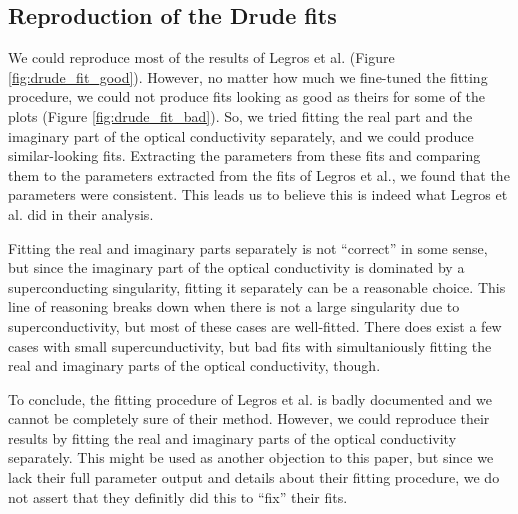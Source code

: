 \subsection{Reproduction of the Drude fits}
We could reproduce most of the results of Legros et al. (Figure \ref{fig:drude_fit_good}).
However, no matter how much we fine-tuned the fitting procedure, we could not produce fits looking
as good as theirs for some of the plots (Figure \ref{fig:drude_fit_bad}). So, we tried fitting the
real part and the imaginary part of the optical conductivity separately, and we could produce
similar-looking fits. Extracting the parameters from these fits and comparing them to the parameters
extracted from the fits of Legros et al., we found that the parameters were consistent. This leads
us to believe this is indeed what Legros et al. did in their analysis. 

Fitting the real and imaginary parts separately is not ``correct'' in some sense, but since the
imaginary part of the optical conductivity is dominated by a superconducting singularity, fitting
it separately can be a reasonable choice. This line of reasoning breaks down when there is not a
large singularity due to superconductivity, but most of these cases are well-fitted. There does
exist a few cases with small supercunductivity, but bad fits with simultaniously fitting the real
and imaginary parts of the optical conductivity, though.

To conclude, the fitting procedure of Legros et al. is badly documented and we cannot be completely
sure of their method. However, we could reproduce their results by fitting the real and imaginary
parts of the optical conductivity separately. This might be used as another objection to this paper,
but since we lack their full parameter output and details about their fitting procedure, we do not
assert that they definitly did this to ``fix'' their fits.


